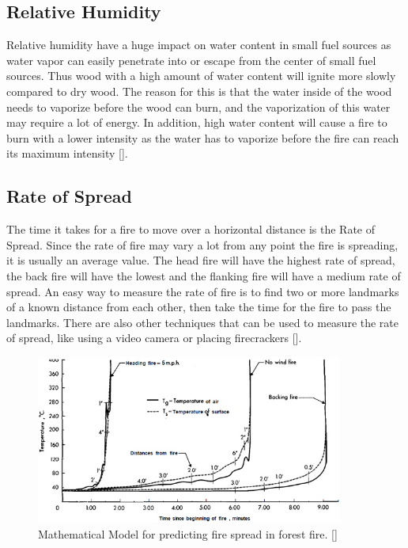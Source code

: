 \subsection{Relative Humidity}
Relative humidity have a huge impact on water content in small fuel sources as water vapor can easily penetrate into or escape from the center of small fuel sources. Thus wood with a high amount of water content will ignite more slowly compared to dry wood. The reason for this is that the water inside of the wood needs to vaporize before the wood can burn, and the vaporization of this water may require a lot of energy. In addition, high water content will cause a fire to burn with a lower intensity as the water has to vaporize before the fire can reach its maximum intensity [].
\subsection{Rate of Spread}
The time it takes for a fire to move over a horizontal distance is the Rate of Spread. Since the rate of fire may vary a lot from any point the fire is spreading, it is usually an average value. The head fire will have the highest rate of spread, the back fire will have the lowest and the flanking fire will have a medium rate of spread. An easy way to measure the rate of fire is to find two or more landmarks of a known distance from each other, then take the time for the fire to pass the landmarks. There are also other techniques that can be used to measure the rate of spread, like using a video camera or placing firecrackers [].
\begin{figure}[here]
  \centering
      \includegraphics[width=0.9\textwidth]{theory/graphics/fire-prediction.jpg}
  \caption{Mathematical Model for predicting fire spread in forest fire. [] }
  \label{fig:fire-prediction}
\end{figure}
